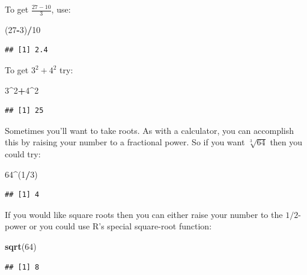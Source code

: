 \documentclass[]{book}
\makeatletter
\newenvironment{Shaded}{\begin{snugshade}}{\end{snugshade}}
\newcommand{\KeywordTok}[1]{\textcolor[rgb]{0.13,0.29,0.53}{\textbf{#1}}}
\newcommand{\DecValTok}[1]{\textcolor[rgb]{0.00,0.00,0.81}{#1}}
\newcommand{\OperatorTok}[1]{\textcolor[rgb]{0.81,0.36,0.00}{\textbf{#1}}}
\newcommand{\NormalTok}[1]{#1}
\newenvironment{kframe}{%
\medskip{}
\setlength{\fboxsep}{.8em}
 \def\at@end@of@kframe{}%
 \ifinner\ifhmode%
  \def\at@end@of@kframe{\end{minipage}}%
  \begin{minipage}{\columnwidth}%
 \fi\fi%
 \def\FrameCommand##1{\hskip\@totalleftmargin \hskip-\fboxsep
 \colorbox{shadecolor}{##1}\hskip-\fboxsep
     \hskip-\linewidth \hskip-\@totalleftmargin \hskip\columnwidth}%
 \MakeFramed {\advance\hsize-\width
   \@totalleftmargin\z@ \linewidth\hsize
   \@setminipage}}%
 {\par\unskip\endMakeFramed%
 \at@end@of@kframe}
\renewenvironment{Shaded}{\begin{kframe}}{\end{kframe}}
\theoremstyle{definition}
\theoremstyle{definition}
\theoremstyle{definition}
\theoremstyle{remark}
\makeatother
\begin{document}
To get \(\frac{27-10}{3}\), use:

\begin{Shaded}
\begin{Highlighting}[]
\NormalTok{(}\DecValTok{27}\OperatorTok{-}\DecValTok{3}\NormalTok{)}\OperatorTok{/}\DecValTok{10}
\end{Highlighting}
\end{Shaded}

\begin{verbatim}
## [1] 2.4
\end{verbatim}

To get \(3^2 + 4^2\) try:

\begin{Shaded}
\begin{Highlighting}[]
\DecValTok{3}\OperatorTok{^}\DecValTok{2}\OperatorTok{+}\DecValTok{4}\OperatorTok{^}\DecValTok{2}
\end{Highlighting}
\end{Shaded}

\begin{verbatim}
## [1] 25
\end{verbatim}

Sometimes you'll want to take roots. As with a calculator, you can
accomplish this by raising your number to a fractional power. So if you
want \(\sqrt[3]{64}\) then you could try:

\begin{Shaded}
\begin{Highlighting}[]
\DecValTok{64}\OperatorTok{^}\NormalTok{(}\DecValTok{1}\OperatorTok{/}\DecValTok{3}\NormalTok{)}
\end{Highlighting}
\end{Shaded}

\begin{verbatim}
## [1] 4
\end{verbatim}

If you would like square roots then you can either raise your number to
the \(1/2\)-power or you could use R's special square-root function:

\begin{Shaded}
\begin{Highlighting}[]
\KeywordTok{sqrt}\NormalTok{(}\DecValTok{64}\NormalTok{)}
\end{Highlighting}
\end{Shaded}

\begin{verbatim}
## [1] 8
\end{verbatim}
\end{document}
